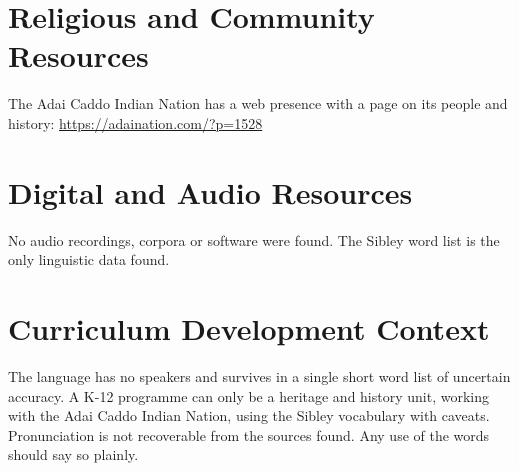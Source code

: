 \documentclass[12pt]{article}
\begin{document}
\section{Religious and Community Resources}
The Adai Caddo Indian Nation has a web presence with a page on its people and history: \url{https://adaination.com/?p=1528}

\section{Digital and Audio Resources}
No audio recordings, corpora or software were found. The Sibley word list is the only linguistic data found.

\section{Curriculum Development Context}
The language has no speakers and survives in a single short word list of uncertain accuracy. A K-12 programme can only be a heritage and history unit, working with the Adai Caddo Indian Nation, using the Sibley vocabulary with caveats. Pronunciation is not recoverable from the sources found. Any use of the words should say so plainly.
\end{document}
